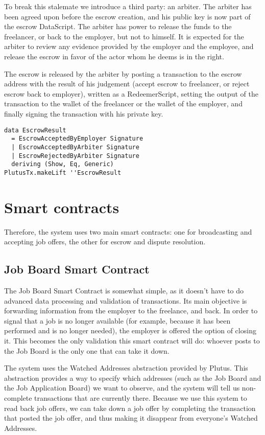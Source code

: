 \documentclass{article}
\begin{document}
To break this stalemate we introduce a third party: an arbiter. The arbiter has been agreed upon before the escrow creation, and his public key is now part of the escrow DataScript. The arbiter has power to release the funds to the freelancer, or back to the employer, but not to himself. It is expected for the arbiter to review any evidence provided by the employer and the employee, and release the escrow in favor of the actor whom he deems is in the right.

The escrow is released by the arbiter by posting a transaction to the escrow address with the result of his judgement (accept escrow to freelancer, or reject escrow back to employer), written as a RedeemerScript, setting the output of the transaction to the wallet of the freelancer or the wallet of the employer, and finally signing the transaction with his private key.

\begin{verbatim}
data EscrowResult
  = EscrowAcceptedByEmployer Signature
  | EscrowAcceptedByArbiter Signature
  | EscrowRejectedByArbiter Signature
  deriving (Show, Eq, Generic)
PlutusTx.makeLift ''EscrowResult
\end{verbatim}

\section{Smart contracts}
Therefore, the system uses two main smart contracts: one for broadcasting and accepting job offers, the other for escrow and dispute resolution.

\subsection{Job Board Smart Contract}
The Job Board Smart Contract is somewhat simple, as it doesn't have to do advanced data processing and validation of transactions. Its main objective is forwarding information from the employer to the freelance, and back. In order to signal that a job is no longer available (for example, because it has been performed and is no longer needed), the employer is offered the option of closing it. This becomes the only validation this smart contract will do: whoever posts to the Job Board is the only one that can take it down.

The system uses the Watched Addresses abstraction provided by Plutus. This abstraction provides a way to specify which addresses (such as the Job Board and the Job Application Board) we want to observe, and the system will tell us non-complete transactions that are currently there. Because we use this system to read back job offers, we can take down a job offer by completing the transaction that posted the job offer, and thus making it disappear from everyone's Watched Addresses.
\end{document}
